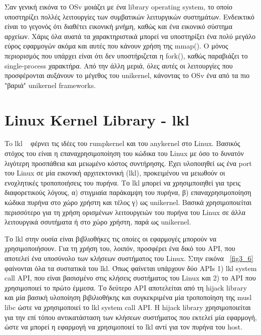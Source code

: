 Σαν γενική εικόνα το OSv μοιάζει με ένα library operating system, το οποίο
υποστηρίζει πολλές λειτουργίες των συμβατικών λειτυργικών συστημάτων. Ενδεικτικό
είναι το γεγονός ότι διαθέτει εικονική μνήμη, καθώς και ένα εικονικό σύστημα
αρχείων. Χάρις όλα αυατά τα χαρακτηριστικά μπορεί να υποστηρίξει ένα πολύ μεγάλο
εύρος εφαρμογών ακόμα και αυτές που κάνουν χρήση της mmap(). Ο μόνος περιορισμός
που υπάρχει είναι ότι δεν υποστήριζεται η fork(), καθώς παραβιάζει το
single-process χαρακτήρα. Από την άλλη μεριά, όλες αυτές οι λειτουργίες που
προσφέρονται αυξάνουν το μέγεθος του unikernel, κάνοντας το OSv ένα από τα πιο
"βαριά" unikernel frameworks. 


\section{Linux Kernel Library - lkl}
To lkl ~\cite{purdila2010lkl} φέρνει τις ιδέες του rumpkernel και του anykernel
στο Linux. Βασικός στόχος του είναι η επαναχρησιμοποίηση του κώδικα του Linux με
όσο το δυνατόν λιγότερη προσπάθεια και μειωμένο κόστος συντήρησης. Έχει
υλοποιηθεί ως ένα port του Linux σε μία εικονική αρχιτεκτονική (lkl),
προκειμένου να μειωθούν οι ενοχλητικές τροποποιήσεις του πυρήνα. Το lkl μπορεί
να χρησιμποιηθεί για τρεις διαφορετικούς λόγους, α) στιγμιαία παράκαμψη του
πυρήνα, β) επαναχρησιμοποίηση κώδικα πυρήνα στο χώρο χρήστη και τέλος γ) ως
unikernel. Βασικά χρησιμοποιείται περισσότερο για τη χρήση ορισμένων
λειτουργειών του πυρήνα του Linux σε άλλα λειτουργικά σσυτήματα ή στο χώρο
χρήστη, παρά ως unikernel.

Το lkl στην ουσία είναι βιβλιοθήκες τις οποίες οι εφαρμογές μπορούν να
χρησιμοποιήσουν. Για τη χρήση του, λοιπόν, προσφέρει ένα δικό του ΑΡΙ, που
αποτελεί ένα υποσύνολο των κλήσεων συστήματος του Linux. Στην εικόνα
~\ref{fig3_6} φαίνονται όλα τα συστατικά του lkl. Όπως φαίνεται υπάρχουν δύο
APIs 1) lkl system call API, που είναι βασισμένο στις κλήσεις συστήματος του
Linux  και 2) το API που χρησιμοποιεί το πρώτο έμμεσα. Το δεύτερο API
αποτελείται από τη hijack library και μία βασική υλοποίηση βιβιλιοθήκης και
συγκεκριμένα μία τροποποίηση της musl libc ώστε να χρησιμοποιεί το lkl system
call API. H hijack library χρησιμοποιείται για την επί τόπου αντικατάσταση των
κλήσεων συστήματος που εκτελεί μία εφαρμογή, ώστε να μπορεί η εφαρμογή να
χρησιμοποιεί το lkl αντί για τον πυρήνα του host. 

